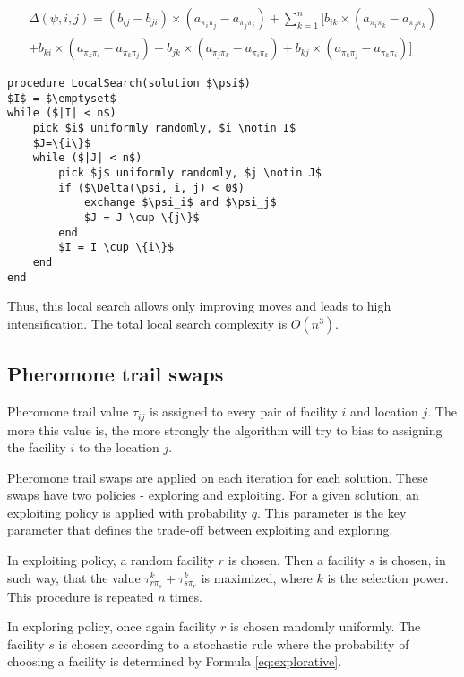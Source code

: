 \documentclass[12pt]{article}
\begin{document}
\begin{multline}
\Delta(\psi,i,j) = (b_{ij} - b_{ji}) \times (a_{\pi_i\pi_j} - a_{\pi_j\pi_i}) + \sum_{k = 1}^{n} [b_{ik} \times (a_{\pi_i\pi_k} - a_{\pi_j\pi_k}) \\+ b_{ki} \times (a_{\pi_k\pi_i} - a_{\pi_k\pi_j}) 
 + b_{jk} \times (a_{\pi_j\pi_k} - a_{\pi_i\pi_k}) + b_{kj} \times (a_{\pi_k\pi_j} - a_{\pi_k\pi_i})]
\label{eq:delta}
\end{multline}

\begin{minipage}[c]{0.95\textwidth}
\begin{lstlisting}[caption={Local Search pseudo-code}, label={lst:local-search},mathescape]
procedure LocalSearch(solution $\psi$)
$I$ = $\emptyset$
while ($|I| < n$)
	pick $i$ uniformly randomly, $i \notin I$
	$J=\{i\}$
	while ($|J| < n$)
		pick $j$ uniformly randomly, $j \notin J$
		if ($\Delta(\psi, i, j) < 0$)
			exchange $\psi_i$ and $\psi_j$
			$J = J \cup \{j\}$
		end
		$I = I \cup \{i\}$
	end
end
\end{lstlisting}
\end{minipage}

Thus, this local search allows only improving moves and leads to high intensification. The total local search complexity is $O(n^3)$.

\subsection{Pheromone trail swaps}

Pheromone trail value $\tau_{ij}$ is assigned to every pair of facility $i$ and location $j$. The more this value is, the more strongly the algorithm will try to bias to assigning the facility $i$ to the location $j$.

Pheromone trail swaps are applied on each iteration for each solution. These swaps have two policies - exploring and exploiting. For a given solution, an exploiting policy is applied with probability $q$. This parameter is the key parameter that defines the trade-off between exploiting and exploring.

In exploiting policy, a random facility $r$ is chosen. Then a facility $s$ is chosen, in such way, that the value $\tau_{r\pi_s}^k + \tau_{s\pi_r}^k$ is maximized, where $k$ is the selection power. This procedure is repeated $n$ times. 

In exploring policy, once again facility $r$ is chosen randomly uniformly. The facility $s$ is chosen according to a stochastic rule where the probability of choosing a facility is determined by Formula \ref{eq:explorative}.
\end{document}
